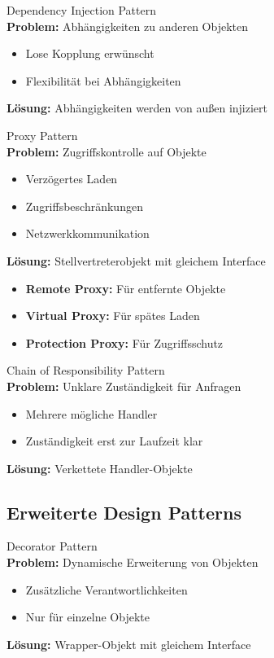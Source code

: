 \begin{definition}{Dependency Injection Pattern}\\
\textbf{Problem:} Abhängigkeiten zu anderen Objekten
\begin{itemize}
    \item Lose Kopplung erwünscht
    \item Flexibilität bei Abhängigkeiten
\end{itemize}
\textbf{Lösung:} Abhängigkeiten werden von außen injiziert
\end{definition}

\begin{definition}{Proxy Pattern}\\
\textbf{Problem:} Zugriffskontrolle auf Objekte
\begin{itemize}
    \item Verzögertes Laden
    \item Zugriffsbeschränkungen
    \item Netzwerkkommunikation
\end{itemize}
\textbf{Lösung:} Stellvertreterobjekt mit gleichem Interface
\begin{itemize}
    \item \textbf{Remote Proxy:} Für entfernte Objekte
    \item \textbf{Virtual Proxy:} Für spätes Laden
    \item \textbf{Protection Proxy:} Für Zugriffsschutz
\end{itemize}
\end{definition}

\begin{definition}{Chain of Responsibility Pattern}\\
\textbf{Problem:} Unklare Zuständigkeit für Anfragen
\begin{itemize}
    \item Mehrere mögliche Handler
    \item Zuständigkeit erst zur Laufzeit klar
\end{itemize}
\textbf{Lösung:} Verkettete Handler-Objekte
\end{definition}

\subsection{Erweiterte Design Patterns}

\begin{definition}{Decorator Pattern}\\
\textbf{Problem:} Dynamische Erweiterung von Objekten
\begin{itemize}
    \item Zusätzliche Verantwortlichkeiten
    \item Nur für einzelne Objekte
\end{itemize}
\textbf{Lösung:} Wrapper-Objekt mit gleichem Interface
\end{definition}

